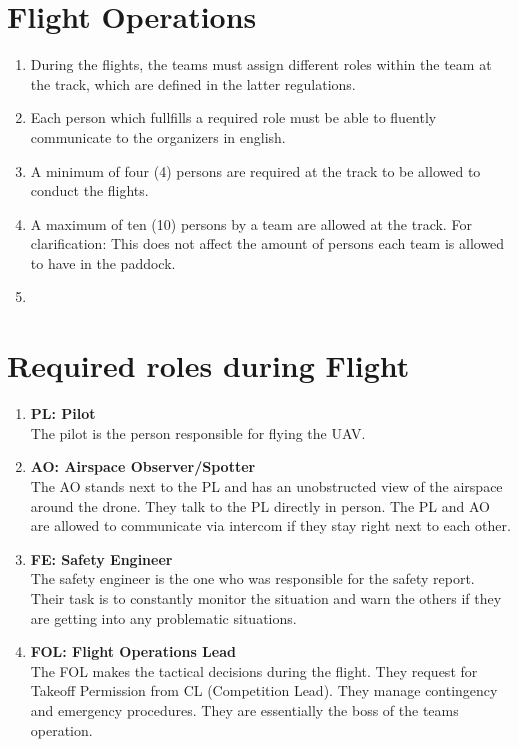     \section{Flight Operations}
    \begin{enumerate}
      \item During the flights, the teams must assign different roles within the team at the track, which are defined in the latter regulations.
      \item Each person which fullfills a required role must be able to fluently communicate to the organizers in english.
      \item A minimum of four (4) persons are required at the track to be allowed to conduct the flights.
      \item A maximum of ten (10) persons by a team are allowed at the track. For clarification: This does not affect the amount of persons each team is allowed to have in the paddock. 
      \item 
    \end{enumerate}

    \section{Required roles during Flight}
    \begin{enumerate}
      \item \textbf{PL: Pilot}\\The pilot is the person responsible for flying the UAV.
      \item \textbf{AO: Airspace Observer/Spotter}\\The AO stands next to the PL and has an unobstructed view of the airspace around the drone. They talk to the PL directly in person. The PL and AO are allowed to communicate via intercom if they stay right next to each other. 
      \item \textbf{FE: Safety Engineer}\\The safety engineer is the one who was responsible for the safety report. Their task is to constantly monitor the situation and warn the others if they are getting into any problematic situations. 
      \item \textbf{FOL: Flight Operations Lead}\\The FOL makes the tactical decisions during the flight. They request for Takeoff Permission from CL (Competition Lead). They manage contingency and emergency procedures. They are essentially the boss of the teams operation.
    \end{enumerate}

